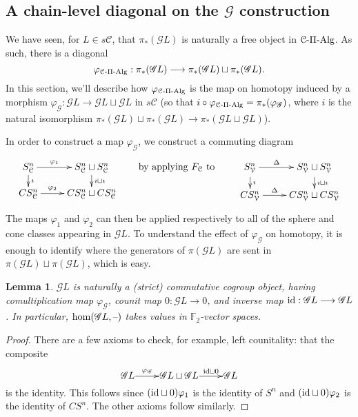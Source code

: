 \documentclass[11pt]{amsart}
\theoremstyle{plain}
\newtheorem{lem}[thm]{Lemma}
\theoremstyle{definition}
\newcommand{\DASH}{\textup{--}}
\let\phi\varphi
\renewcommand{\to}{\longrightarrow}
\newcommand{\scrQ}{\mathscr{Q}}
\newcommand{\scrR}{\mathscr{R}}
\newcommand{\scrT}{\mathscr{T}}
\newcommand{\scrY}{\mathscr{Y}}
\newcommand{\scrI}{\mathscr{I}}
\newcommand{\scrO}{\mathscr{O}}
\newcommand{\scrP}{\mathscr{P}}
\newcommand{\scrS}{\mathscr{S}}
\newcommand{\scrG}{\mathscr{G}}
\newcommand{\scrH}{\mathscr{H}}
\newcommand{\scrJ}{\mathscr{J}}
\newcommand{\scrK}{\mathscr{K}}
\newcommand{\scrL}{\mathscr{L}}
\newcommand{\scrZ}{\mathscr{Z}}
\newcommand{\scrN}{\mathscr{N}}
\newcommand{\scrM}{\mathscr{M}}
\newcommand{\calC}{\mathcal{C}}
\newcommand{\calV}{\mathcal{V}}
\theoremstyle{plain}
\newcommand{\vect}[2]{\calV^{#1}_{#2}}
\newcommand{\BSW}{{\scrG}}%
\newcommand{\PiAlg}{\textup{-$\Pi$-Alg}}
\newcommand{\F}{\mathbb{F}}
\begin{document}
\begin{Composite functor spectral sequences}
\subsection{A chain-level diagonal on the $\BSW $ construction}
\label{Subsection: Chain level diagonal}
We have seen, for $L\in s\calC$, that $\pi_*(\BSW L)$ is naturally a free object in $\calC\PiAlg$. As such, there is a diagonal
\[\phi_{\calC\PiAlg}:\pi_*(\BSW L)\to \pi_*(\BSW L)\sqcup \pi_*(\BSW L).\]
In this section, we'll describe how $\phi_{\calC\PiAlg}$ is the map on homotopy induced by a morphism $\phi_\BSW :\BSW L\to \BSW L\sqcup \BSW L$ in $s\calC$ (so that $i\circ\phi_{\calC\PiAlg}=\pi_*(\phi_{\BSW})$, where $i$ is the natural isomorphism $\pi_*(\BSW L)\sqcup\pi_*(\BSW L)\to \pi_*(\BSW L\sqcup \BSW L)$).

In order to construct a map $\phi_\BSW $, we construct a commuting diagram
\[\xymatrix@R=4mm{
S^n_{\calC}\ar[r]^-{\phi_1}
\ar[d]^-{\imath}
&%
S^n_{\calC}\sqcup S^n_{\calC}\ar[d]^-{\imath\sqcup\imath}
\\%
CS^n_{\calC}\ar[r]^-{\phi_2}
&%
CS^n_{\calC}\sqcup CS^n_{\calC}%
}\qquad \textup{by applying $F_\calC$ to }\qquad \xymatrix@R=4mm{
S^n_{\vect{}{}}\ar[r]^-{\Delta}
\ar[d]^-{\imath}
&%
S^n_{\vect{}{}}\sqcup S^n_{\vect{}{}}\ar[d]^-{\imath\sqcup\imath}
\\%
CS^n_{\vect{}{}}\ar[r]^-{\Delta}
&%
CS^n_{\vect{}{}}\sqcup CS^n_{\vect{}{}}%
}\]
The maps $\phi_1$ and $\phi_2$ can then be applied respectively to all of the sphere and cone classes appearing in $\BSW L$.
To understand the effect of $\phi_{\BSW }$ on homotopy, it is enough to identify where the generators of $\pi(\BSW L)$ are sent in $\pi(\BSW L)\sqcup\pi(\BSW L)$, which is easy.
\begin{lem}
$\BSW L$ is naturally a (strict) commutative cogroup object, having comultiplication map $\phi_{\BSW }$, counit map $0:\BSW L\to 0$, and inverse map $\textup{id}:\BSW L\to \BSW L$. In particular, $\hom(\BSW L,\DASH)$ takes values in $\ensuremath{\F_2}$-vector spaces.
\end{lem}
\begin{proof}
There are a few axioms to check, for example, left counitality: that the composite 
\[\xymatrix@R=4mm@1{
\BSW L\ar[r]^-{\phi_{\BSW }}
&%
\BSW L\sqcup \BSW L\ar[r]^-{\textup{id}\sqcup0}
&%
\BSW L%
}\] is the identity. This follows since $(\textup{id}\sqcup0)\phi_1$ is the identity of $S^n$ and $(\textup{id}\sqcup0)\phi_2$ is the identity of $CS^n$. The other axioms follow similarly.
\end{proof}


\end{Composite functor spectral sequences}
\end{document}
